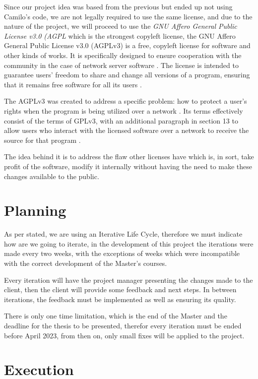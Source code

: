 Since our project idea was based from the previous but ended up not using Camilo's code, we are not legally required to use the same license, and due to the nature of the project, we will proceed to use the \textit{GNU Affero General Public License v3.0 (AGPL} which is the strongest copyleft license, the GNU Affero General Public License v3.0 (AGPLv3) is a free, copyleft license for software and other kinds of works. It is specifically designed to ensure cooperation with the community in the case of network server software \cite{fsf1}. The license is intended to guarantee users’ freedom to share and change all versions of a program, ensuring that it remains free software for all its users \cite{fsf1}.


The AGPLv3 was created to address a specific problem: how to protect a user’s rights when the program is being utilized over a network \cite{fsf2}. Its terms effectively consist of the terms of GPLv3, with an additional paragraph in section 13 to allow users who interact with the licensed software over a network to receive the source for that program \cite{fsf3}. 


The idea behind it is to address the flaw other licenses have which is, in sort, take profit of the software, modify it internally without having the need to make these changes available to the public.

\section{Planning}
As per stated, we are using an Iterative Life Cycle, therefore we must indicate how are we going to iterate, in the development of this project the iterations were made every two weeks, with the exceptions of weeks which were incompatible with the correct development of the Master's courses.

Every iteration will have the project manager presenting the changes made to the client, then the client will provide some feedback and next steps. In between iterations, the feedback must be implemented as well as ensuring its quality.

There is only one time limitation, which is the end of the Master and the deadline for the thesis to be presented, therefor every iteration must be ended before April 2023, from then on, only small fixes will be applied to the project.
\section{Execution}
